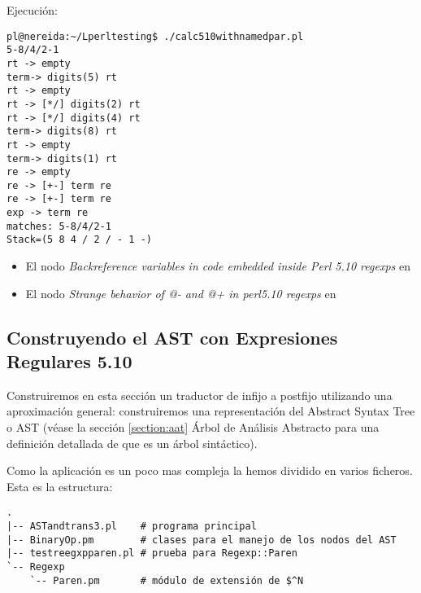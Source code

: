 Ejecución:
\begin{verbatim}
pl@nereida:~/Lperltesting$ ./calc510withnamedpar.pl
5-8/4/2-1
rt -> empty
term-> digits(5) rt
rt -> empty
rt -> [*/] digits(2) rt
rt -> [*/] digits(4) rt
term-> digits(8) rt
rt -> empty
term-> digits(1) rt
re -> empty
re -> [+-] term re
re -> [+-] term re
exp -> term re
matches: 5-8/4/2-1
Stack=(5 8 4 / 2 / - 1 -)
\end{verbatim}


\begin{itemize}
\item
El nodo {\it Backreference variables in code embedded inside Perl 5.10 regexps} en 

\item
El nodo {\it Strange behavior of @- and @+ in perl5.10 regexps} en 

\end{itemize}


\subsection{Construyendo el AST con Expresiones Regulares 5.10}

Construiremos en esta sección un traductor de infijo a postfijo
utilizando una aproximación general: construiremos una representación
del Abstract Syntax Tree o AST (véase la sección 
\ref{section:aat}
Árbol de Análisis Abstracto para una definición detallada de que es un árbol sintáctico).

Como la aplicación es un poco mas compleja la hemos dividido en varios ficheros.
Esta es la estructura:

\begin{verbatim}
.
|-- ASTandtrans3.pl    # programa principal
|-- BinaryOp.pm        # clases para el manejo de los nodos del AST
|-- testreegxpparen.pl # prueba para Regexp::Paren
`-- Regexp
    `-- Paren.pm       # módulo de extensión de $^N
\end{verbatim}


